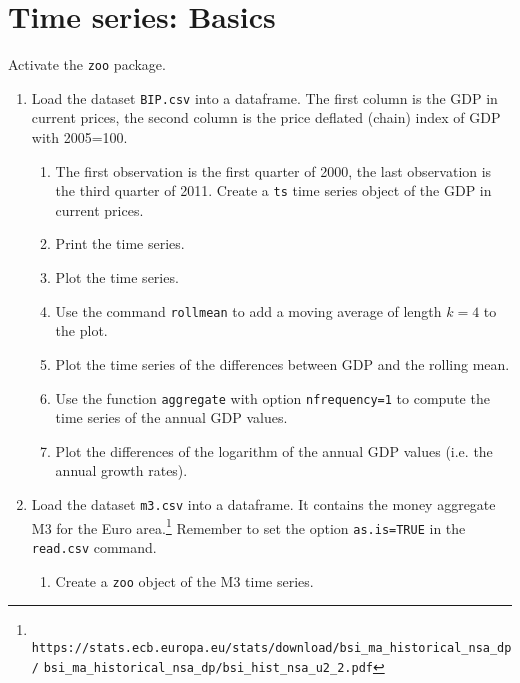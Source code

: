 \documentclass{article}
\begin{document}
\section{Time series: Basics\label{tsbasics}}

Activate the \texttt{zoo} package.

\begin{enumerate}
\item Load the dataset \texttt{BIP.csv} into a dataframe. The first column
is the GDP in current prices, the second column is the price deflated
(chain) index of GDP with 2005=100.

\begin{enumerate}
\item The first observation is the first quarter of 2000, the last
observation is the third quarter of 2011. Create a \texttt{ts} time series
object of the GDP in current prices.

\item Print the time series.

\item Plot the time series.

\item Use the command \texttt{rollmean} to add a moving average of length $%
k=4$ to the plot.

\item Plot the time series of the differences between GDP and the rolling
mean.

\item Use the function \texttt{aggregate} with option \texttt{nfrequency=1}
to compute the time series of the annual GDP values.

\item Plot the differences of the logarithm of the annual GDP values (i.e.
the annual growth rates).
\end{enumerate}

\item Load the dataset \texttt{m3.csv} into a dataframe. It contains the
money aggregate M3 for the Euro area.\footnote{\texttt{%
https://stats.ecb.europa.eu/stats/download/bsi\_ma\_historical\_nsa\_dp/}%
\newline
\texttt{bsi\_ma\_historical\_nsa\_dp/bsi\_hist\_nsa\_u2\_2.pdf}} Remember to
set the option \texttt{as.is=TRUE} in the \texttt{read.csv} command.

\begin{enumerate}
\item Create a \texttt{zoo} object of the M3 time series.


\end{enumerate}
\end{enumerate}
\end{document}

